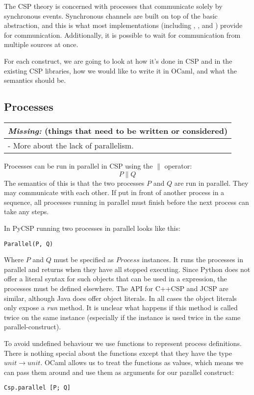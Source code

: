 \documentclass[a4paper,12pt]{article}
\newcommand{\missing}[1]{
  \begin{tabular}{|p{11cm}|}
    \hline
    \emph{Missing:} {\scriptsize (things that need to be written or considered)} \\
    \hline
    #1
    \hline
  \end{tabular}
}
\begin{document}
The CSP theory is concerned with processes that communicate solely by synchronous 
events. Synchronous channels are built on top of the basic abstraction, and this is
what most implementations (including \cite{occam}, \cite{c++csp}, \cite{jcsp} and 
\cite{pycsp}) provide for communication. 
Additionally, it is possible to wait for communication from multiple sources at once.

For each construct, we are going to look at how it's done in CSP and in the 
existing CSP libraries, how we would like to write it in OCaml, and what the 
semantics should be.

\subsection{Processes}
\missing{
- More about the lack of parallelism.\\
}

Processes can be run in parallel in CSP using the $\parallel$ operator:
\[P \parallel Q\]
The semantics of this is that the two processes $P$ and $Q$ are run in parallel. They
may communicate with each other. If put in front of another process in a sequence, all
processes running in parallel must finish before the next process can take any steps.

In PyCSP running two processes in parallel looks like this:
\begin{verbatim}
Parallel(P, Q)
\end{verbatim}
Where $P$ and $Q$ must be specified as $Process$ instances. It runs the processes in
parallel and returns when they have all stopped executing. Since Python does not offer
a literal syntax for such objects that can be used in a expression, the processes must
be defined elsewhere. The API for C++CSP and JCSP are similar, although Java does offer
object literals. In all cases the object literals only expose a \emph{run} method. 
It is unclear what happens if this method is called twice on the same instance 
(especially if the instance is used twice in the same parallel-construct).

To avoid undefined behaviour we use functions to represent process definitions. There is 
nothing special about the functions except that they have the type $unit \to unit$. OCaml 
allows us to treat the functions as values, which means we can pass them around and use 
them as arguments for our parallel construct:

\begin{verbatim}
Csp.parallel [P; Q]
\end{verbatim}
\end{document}

